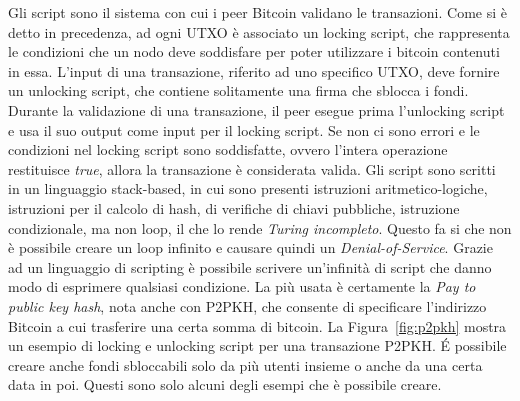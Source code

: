 Gli script sono il sistema con cui i peer Bitcoin validano le transazioni. Come si è detto in precedenza, ad ogni UTXO è associato un locking script, che rappresenta le condizioni che un nodo deve soddisfare per poter utilizzare i bitcoin contenuti in essa. L'input di una transazione, riferito ad uno specifico UTXO, deve fornire un unlocking script, che contiene solitamente una firma che sblocca i fondi. Durante la validazione di una transazione, il peer esegue prima l'unlocking script e usa il suo output come input per il locking script. Se non ci sono errori e le condizioni nel locking script sono soddisfatte, ovvero l'intera operazione restituisce \emph{true}, allora la transazione è considerata valida.
Gli script sono scritti in un linguaggio stack-based, in cui sono presenti istruzioni aritmetico-logiche, istruzioni per il calcolo di hash, di verifiche di chiavi pubbliche, istruzione condizionale, ma non loop, il che lo rende \emph{Turing incompleto}. Questo fa si che non è possibile creare un loop infinito e causare quindi un \emph{Denial-of-Service}. Grazie ad un linguaggio di scripting è possibile scrivere un'infinità di script che danno modo di esprimere qualsiasi condizione. La più usata è certamente la \emph{Pay to public key hash}, nota anche con P2PKH, che consente di specificare l'indirizzo Bitcoin a cui trasferire una certa somma di bitcoin. La Figura~\ref{fig:p2pkh} mostra un esempio di locking e unlocking script per una transazione P2PKH. \'E possibile creare anche fondi sbloccabili solo da più utenti insieme o anche da una certa data in poi. Questi sono solo alcuni degli esempi che è possibile creare.


